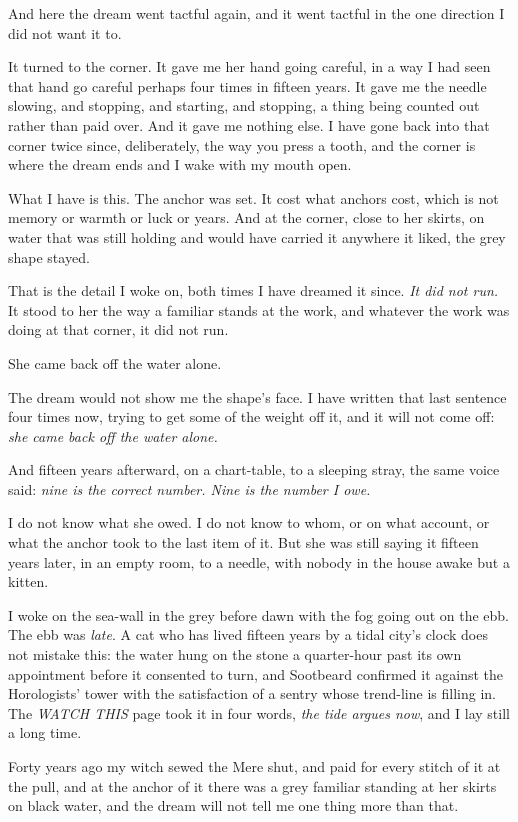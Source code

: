 And here the dream went tactful again, and it went tactful in the one direction I did not want it to.

It turned to the corner. It gave me her hand going careful, in a way I had seen that hand go careful perhaps four times in fifteen years. It gave me the needle slowing, and stopping, and starting, and stopping, a thing being counted out rather than paid over. And it gave me nothing else. I have gone back into that corner twice since, deliberately, the way you press a tooth, and the corner is where the dream ends and I wake with my mouth open.

What I have is this. The anchor was set. It cost what anchors cost, which is not memory or warmth or luck or years. And at the corner, close to her skirts, on water that was still holding and would have carried it anywhere it liked, the grey shape stayed.

That is the detail I woke on, both times I have dreamed it since. \emph{It did not run.} It stood to her the way a familiar stands at the work, and whatever the work was doing at that corner, it did not run.

She came back off the water alone.

The dream would not show me the shape's face. I have written that last sentence four times now, trying to get some of the weight off it, and it will not come off: \emph{she came back off the water alone.}

And fifteen years afterward, on a chart-table, to a sleeping stray, the same voice said: \emph{nine is the correct number. Nine is the number I owe.}

I do not know what she owed. I do not know to whom, or on what account, or what the anchor took to the last item of it. But she was still saying it fifteen years later, in an empty room, to a needle, with nobody in the house awake but a kitten.

\scenebreak

I woke on the sea-wall in the grey before dawn with the fog going out on the ebb. The ebb was \emph{late}. A cat who has lived fifteen years by a tidal city's clock does not mistake this: the water hung on the stone a quarter-hour past its own appointment before it consented to turn, and Sootbeard confirmed it against the Horologists' tower with the satisfaction of a sentry whose trend-line is filling in. The \emph{WATCH THIS} page took it in four words, \emph{the tide argues now}, and I lay still a long time.

Forty years ago my witch sewed the Mere shut, and paid for every stitch of it at the pull, and at the anchor of it there was a grey familiar standing at her skirts on black water, and the dream will not tell me one thing more than that.

